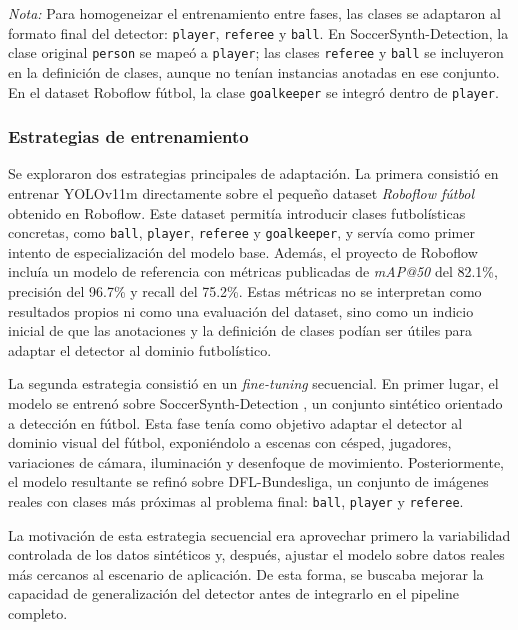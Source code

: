 \noindent\textit{Nota:} Para homogeneizar el entrenamiento entre fases, las clases se adaptaron al formato final del detector: \texttt{player}, \texttt{referee} y \texttt{ball}. En SoccerSynth-Detection, la clase original \texttt{person} se mapeó a \texttt{player}; las clases \texttt{referee} y \texttt{ball} se incluyeron en la definición de clases, aunque no tenían instancias anotadas en ese conjunto. En el dataset Roboflow fútbol, la clase \texttt{goalkeeper} se integró dentro de \texttt{player}.

\subsubsection{Estrategias de entrenamiento}

Se exploraron dos estrategias principales de adaptación. La primera consistió en entrenar YOLOv11m directamente sobre el pequeño dataset \textit{Roboflow fútbol} obtenido en Roboflow. Este dataset permitía introducir clases futbolísticas concretas, como \texttt{ball}, \texttt{player}, \texttt{referee} y \texttt{goalkeeper}, y servía como primer intento de especialización del modelo base. Además, el proyecto de Roboflow incluía un modelo de referencia con métricas publicadas de \textit{mAP@50} del 82.1\%, precisión del 96.7\% y recall del 75.2\%. Estas métricas no se interpretan como resultados propios ni como una evaluación del dataset, sino como un indicio inicial de que las anotaciones y la definición de clases podían ser útiles para adaptar el detector al dominio futbolístico.

La segunda estrategia consistió en un \textit{fine-tuning} secuencial. En primer lugar, el modelo se entrenó sobre SoccerSynth-Detection \citep{SoccerSynthDetection2025}, un conjunto sintético orientado a detección en fútbol. Esta fase tenía como objetivo adaptar el detector al dominio visual del fútbol, exponiéndolo a escenas con césped, jugadores, variaciones de cámara, iluminación y desenfoque de movimiento. Posteriormente, el modelo resultante se refinó sobre DFL-Bundesliga, un conjunto de imágenes reales con clases más próximas al problema final: \texttt{ball}, \texttt{player} y \texttt{referee}.

La motivación de esta estrategia secuencial era aprovechar primero la variabilidad controlada de los datos sintéticos y, después, ajustar el modelo sobre datos reales más cercanos al escenario de aplicación. De esta forma, se buscaba mejorar la capacidad de generalización del detector antes de integrarlo en el pipeline completo.


